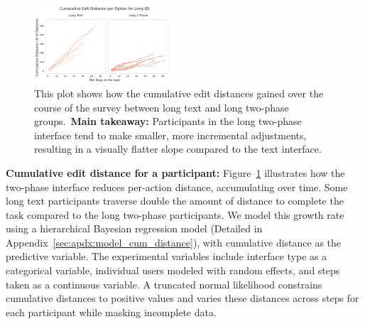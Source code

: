 \begin{figure}[h]
    \centering
    \includegraphics[width=0.45\textwidth]{content/image/distance/cumulative_edit_distance_per_option_long_qs_v3v4.pdf}
    \caption{This plot shows how the cumulative edit distances gained over the course of the survey between long text and long two-phase groups.~\textbf{Main takeaway:} Participants in the long two-phase interface tend to make smaller, more incremental adjustments, resulting in a visually flatter slope compared to the text interface.}
    \label{fig:cumulative-distance}
\end{figure}

\textbf{Cumulative edit distance for a participant:} Figure~\ref{fig:cumulative-distance} illustrates how the two-phase interface reduces per-action distance, accumulating over time. Some long text participants traverse double the amount of distance to complete the task compared to the long two-phase participants. We model this growth rate using a hierarchical Bayesian regression model (Detailed in Appendix~\ref{sec:apdx:model_cum_distance}), with cumulative distance as the predictive variable. The experimental variables include interface type as a categorical variable, individual users modeled with random effects, and steps taken as a continuous variable. A truncated normal likelihood constrains cumulative distances to positive values and varies these distances across steps for each participant while masking incomplete data.

